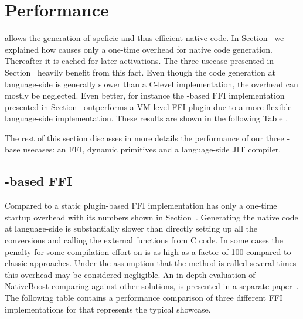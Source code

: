 \section{Performance}
\B allows the generation of speficic and thus efficient native code.
In Section~ we explained how \B causes only a one-time overhead for native code generation. 
Thereafter it is cached for later activations.
The three usecase presented in Section~ heavily benefit from this fact.
Even though the code generation at language-side is generally slower than a C-level implementation, the overhead can mostly be neglected.
Even better, for instance the \B-based FFI implementation presented in Section~ outperforms a VM-level FFI-plugin due to a more flexible language-side implementation. 
These results are shown in the following Table .

The rest of this section discusses in more details the performance of our three \B-base usecases: an FFI, dynamic primitives and a language-side JIT compiler.

\subsection{\B-based FFI}

Compared to a static plugin-based FFI implementation \NB has only a one-time startup overhead with its numbers shown in Section~.
Generating the native code at language-side is substantially slower than directly setting up all the conversions and calling the external functions from C code. 
In some cases the penalty for some compilation effort on \NB is as high as a factor of 100 compared to classic approaches.
Under the assumption that the method is called several times this overhead may be considered negligible.
An in-depth evaluation of NativeBoost comparing against other solutions, is presented in a separate paper~\cite{Brun13a}.
The following table contains a performance comparison of three different FFI implementations for \PH that represents the typical showcase.

